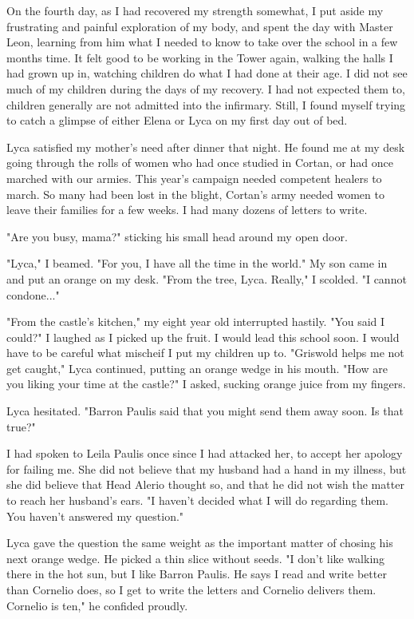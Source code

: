 \documentclass{article}
\begin{document}
On the fourth day, as I had recovered my strength somewhat, I put aside my frustrating and painful exploration of my body, and spent the day with Master Leon, learning from him what I needed to know to take over the school in a few months time. It felt good to be working in the Tower again, walking the halls I had grown up in, watching children do what I had done at their age. I did not see much of my children during the days of my recovery. I had not expected them to, children generally are not admitted into the infirmary. Still, I found myself trying to catch a glimpse of either Elena or Lyca on my first day out of bed.

Lyca satisfied my mother's need after dinner that night. He found me at my desk going through the rolls of women who had once studied in Cortan, or had once marched with our armies. This year's campaign needed competent healers to march. So many had been lost in the blight, Cortan's army needed women to leave their families for a few weeks. I had many dozens of letters to write.

"Are you busy, mama?" sticking his small head around my open door.

"Lyca," I beamed. "For you, I have all the time in the world." My son came in and put an orange on my desk. "From the tree, Lyca. Really," I scolded. "I cannot condone..."

"From the castle's kitchen," my eight year old interrupted hastily. "You said I could?" I laughed as I picked up the fruit. I would lead this school soon. I would have to be careful what mischeif I put my children up to. "Griswold helps me not get caught," Lyca continued, putting an orange wedge in his mouth. 
"How are you liking your time at the castle?" I asked, sucking orange juice from my fingers. 

Lyca hesitated. "Barron Paulis said that you might send them away soon. Is that true?"

I had spoken to Leila Paulis once since I had attacked her, to accept her apology for failing me. She did not believe that my husband had a hand in my illness, but she did believe that Head Alerio thought so, and that he did not wish the matter to reach her husband's ears. "I haven't decided what I will do regarding them. You haven't answered my question."

Lyca gave the question the same weight as the important matter of chosing his next orange wedge. He picked a thin slice without seeds. "I don't like walking there in the hot sun, but I like Barron Paulis. He says I read and write better than Cornelio does, so I get to write the letters and Cornelio delivers them. Cornelio is ten," he confided proudly.
\end{document}
